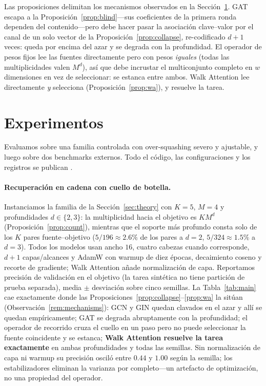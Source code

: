 \documentclass[runningheads]{llncs}
\begin{document}
\begin{remark}\label{rem:mechanisms}
Las proposiciones delimitan los mecanismos observados en la
Sección~\ref{sec:exp}. GAT escapa a la Proposición~\ref{prop:blind}---sus
coeficientes de la primera ronda dependen del contenido---pero debe hacer pasar
la asociación clave--valor por el canal de un solo vector de la
Proposición~\ref{prop:collapse}, re-codificado $d+1$ veces: queda por encima
del azar y se degrada con la profundidad. El operador de pesos fijos lee las
fuentes directamente pero con pesos \emph{iguales} (todas las multiplicidades
valen $M^d$), así que debe incrustar el multiconjunto completo en $w$
dimensiones en vez de seleccionar: se estanca entre ambos. Walk Attention lee
directamente \emph{y} selecciona (Proposición~\ref{prop:wa}), y resuelve la
tarea.
\end{remark}

\section{Experimentos}\label{sec:exp}

Evaluamos sobre una familia controlada con over-squashing severo y ajustable, y
luego sobre dos benchmarks externos. Todo el código, las configuraciones y los
registros se publican \cite{repo_walkattention}.

\paragraph{Recuperación en cadena con cuello de botella.}
Instanciamos la familia de la Sección~\ref{sec:theory} con $K{=}5$, $M{=}4$ y
profundidades $d\in\{2,3\}$: la multiplicidad hacia el objetivo es $KM^d$
(Proposición~\ref{prop:count}), mientras que el soporte más profundo consta
solo de los $K$ pares fuente--objetivo ($5/196\approx2.6\%$ de los pares a
$d{=}2$, $5/324\approx1.5\%$ a $d{=}3$). Todos los modelos usan ancho $16$,
cuatro cabezas cuando corresponde, $d{+}1$ capas/alcances y AdamW con warmup de
diez épocas, decaimiento coseno y recorte de gradiente; Walk Attention añade
normalización de capa. Reportamos precisión de validación en el objetivo (la
tarea sintética no tiene partición de prueba separada), media $\pm$ desviación
sobre cinco semillas. La Tabla~\ref{tab:main} cae exactamente donde las
Proposiciones~\ref{prop:collapse}--\ref{prop:wa} la sitúan
(Observación~\ref{rem:mechanisms}): GCN y GIN quedan clavados en el azar y allí
se quedan empíricamente; GAT se degrada abruptamente con la profundidad; el
operador de recorrido cruza el cuello en un paso pero no puede seleccionar la
fuente coincidente y se estanca; \textbf{Walk Attention resuelve la tarea
exactamente} en ambas profundidades y todas las semillas. Sin normalización de
capa ni warmup su precisión osciló entre $0.44$ y $1.00$ según la semilla; los
estabilizadores eliminan la varianza por completo---un artefacto de
optimización, no una propiedad del operador.
\end{document}
